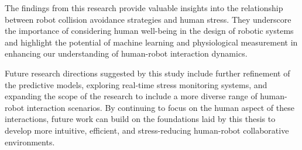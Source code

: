 The findings from this research provide valuable insights into the relationship between robot collision avoidance strategies and human stress. They underscore the importance of considering human well-being in the design of robotic systems and highlight the potential of machine learning and physiological measurement in enhancing our understanding of human-robot interaction dynamics.

Future research directions suggested by this study include further refinement of the predictive models, exploring real-time stress monitoring systems, and expanding the scope of the research to include a more diverse range of human-robot interaction scenarios. By continuing to focus on the human aspect of these interactions, future work can build on the foundations laid by this thesis to develop more intuitive, efficient, and stress-reducing human-robot collaborative environments.


